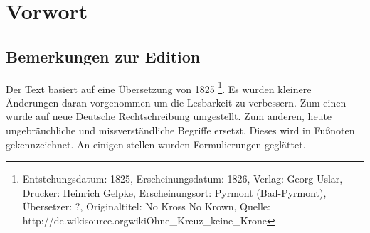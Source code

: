 \part{Vorwort}


\chapter{Bemerkungen zur Edition}
Der Text basiert auf eine Übersetzung von 1825 \footnote{Entstehungsdatum: 1825, Erscheinungsdatum: 1826, Verlag: Georg Uslar, Drucker: Heinrich Gelpke, Erscheinungsort: Pyrmont (Bad-Pyrmont), Übersetzer: ?, Originaltitel: No Kross No Krown, Quelle: http://de.wikisource.org\/wiki\/Ohne\_Kreuz\_keine\_Krone}. Es wurden kleinere Änderungen daran vorgenommen um die Lesbarkeit zu verbessern. Zum einen wurde auf neue Deutsche Rechtschreibung umgestellt. Zum anderen, heute ungebräuchliche und missverständliche Begriffe ersetzt. Dieses wird in Fußnoten gekennzeichnet. An einigen stellen wurden Formulierungen geglättet.